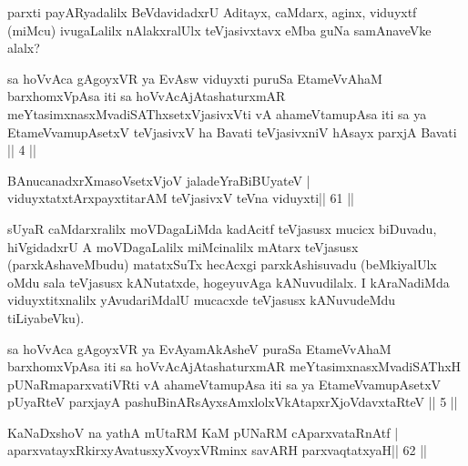 \begin{artha}
parxti payARyadalilx BeVdavidadxrU Aditayx, caMdarx, aginx, viduyxtf (miMcu) ivugaLalilx nAlakxralUlx teVjasivxtavx eMba guNa samAnaveVke alalx?
\end{artha}


\begin{kandikeshl}
sa hoVvAca gAgoyxVR ya EvAsw viduyxti puruSa EtameVvAhaM barxhomxVpAsa iti sa hoVvAcAjAtashaturxmAR meYtasimxnasxMvadiSAThxsetxVjasivxVti vA ahameVtamupAsa iti sa ya EtameVvamupAsetxV teVjasivxV ha Bavati teVjasivxniV hAsayx parxjA Bavati || 4 ||
\end{kandikeshl}



\begin{shl}
BAnucanadxrXmasoVsetxVjoV jaladeYraBiBUyateV |
viduyxtatxtArxpayxtitarAM teVjasivxV teVna viduyxti\hfill || 61 ||
\end{shl}

\begin{artha}
sUyaR caMdarxralilx moVDagaLiMda kadAcitf teVjasusx mucicx biDuvadu, hiVgidadxrU A moVDagaLalilx miMcinalilx mAtarx teVjasusx (parxkAshaveMbudu) matatxSuTx hecAcxgi parxkAshisuvadu (beMkiyalUlx oMdu sala teVjasusx kANutatxde, hogeyuvAga kANuvudilalx. I kAraNadiMda viduyxtitxnalilx yAvudariMdalU mucacxde teVjasusx kANuvudeMdu tiLiyabeVku).
\end{artha}


\begin{kandikeshl}
sa hoVvAca gAgoyxVR ya EvAyamAkAsheV puraSa EtameVvAhaM barxhomxVpAsa iti sa hoVvAcAjAtashaturxmAR meYtasimxnasxMvadiSAThxH pUNaRmaparxvatiVRti vA ahameVtamupAsa iti sa ya EtameVvamupAsetxV pUyaRteV parxjayA pashuBinARsAyxsAmxlolxVkAtapxrXjoVdavxtaRteV || 5 ||
\end{kandikeshl}



\begin{shl}
KaNaDxshoV na yathA mUtaRM KaM pUNaRM cAparxvataRnAtf |
aparxvatayxRkirxyAvatusxyXvoyxVRminx savARH parxvaqtatxyaH\hfill || 62 ||
\end{shl}

